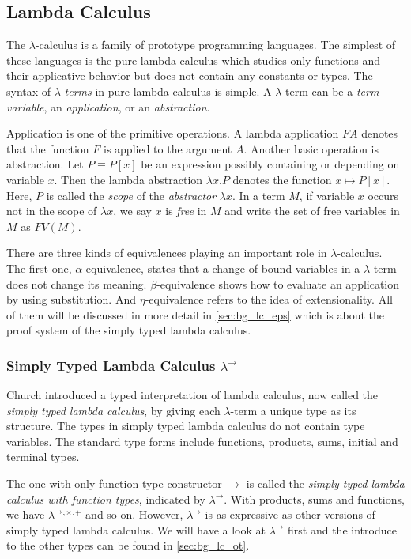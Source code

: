 \clearpage
\subsection{Lambda Calculus}
\label{sec:bg_lc}
The $ \lambda $-calculus is a family of prototype programming languages. The simplest of these languages is the pure lambda calculus which studies only functions and their applicative behavior but does not contain any constants or types. The syntax of $ \lambda $-\emph{terms} in pure lambda calculus is simple. A $ \lambda $-term can be a \emph{term-variable}, an \emph{application}, or an \emph{abstraction}.

Application is one of the primitive operations. A lambda application $ F A $ denotes that the function $ F $ is applied to the argument $ A $. Another basic operation is abstraction. Let $ P \equiv P[x] $ be an expression possibly containing or depending on variable $ x $. Then the lambda abstraction $ \lambda x.P $ denotes the function $ x \mapsto P[x] $. Here, $ P $ is called the \emph{scope} of the \emph{abstractor} $ \lambda x $. In a term $ M $, if variable $ x $ occurs not in the scope of $ \lambda x $, we say $ x $ is \emph{free} in $ M $ and write the set of free variables in $ M $ as $ FV(M) $.

There are three kinds of equivalences playing an important role in $ \lambda $-calculus. The first one, $ \alpha $-equivalence, states that a change of bound variables in a $ \lambda $-term does not change its meaning. $ \beta $-equivalence shows how to evaluate an application by using substitution. And $ \eta $-equivalence refers to the idea of extensionality. All of them will be discussed in more detail in \ref{sec:bg_lc_eps} which is about the proof system of the simply typed lambda calculus.


\subsubsection{Simply Typed Lambda Calculus $ \lambda ^\to $}
\label{sec:bg_lc_stlc}
Church introduced a typed interpretation of lambda calculus, now called the \emph{simply typed lambda calculus}, by giving each $ \lambda $-term a unique type as its structure. The types in simply typed lambda calculus do not contain type variables. The standard type forms include functions, products, sums, initial and terminal types.

The one with only function type constructor $ \to $ is called the \emph{simply typed lambda calculus with function types}, indicated by $ \lambda ^\to $. With products, sums and functions, we have $ \lambda ^\to{}^,{}^\times{}^,{}^+ $ and so on. However, $ \lambda ^\to $ is as expressive as other versions of simply typed lambda calculus. We will have a look at $ \lambda ^\to $ first and the introduce to the other types can be found in \ref{sec:bg_lc_ot}.

